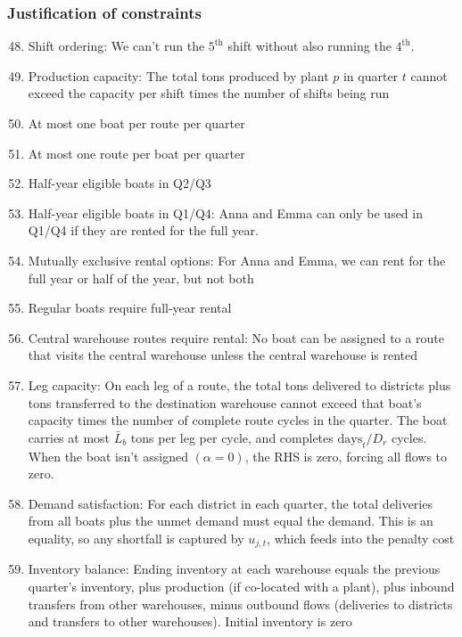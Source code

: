 \documentclass[10pt]{article}
\begin{document}
\subsubsection{Justification of constraints}
\begin{enumerate}
    \setcounter{enumi}{47}
    \item Shift ordering: We can't run the $5^{\text{th}}$ shift without also running the $4^{\text{th}}$. 
    \item Production capacity: The total tons produced by plant $p $ in quarter $t $ cannot exceed the capacity per shift times the number of shifts being run 
    \item At most one boat per route per quarter
    \item At most one route per boat per quarter 
    \item Half-year eligible boats in Q2/Q3
    \item Half-year eligible boats in Q1/Q4: Anna and Emma can only be used in Q1/Q4 if they are rented for the full year. 
    \item Mutually exclusive rental options: For Anna and Emma, we can rent for the full year or half of the year, but not both
    \item Regular boats require full-year rental 
    \item Central warehouse routes require rental: No boat can be assigned to a route that visits the central warehouse unless the central warehouse is rented 
    \item Leg capacity: On each leg of a route, the total tons delivered to districts plus tons transferred to the destination warehouse cannot exceed that boat's capacity times the number of complete route cycles in the quarter. The boat carries at most $\bar{L}_b $ tons per leg per cycle, and completes $\text{days}_t/D_r $ cycles. When the boat isn't assigned $(\alpha = 0) $, the RHS is zero, forcing all flows to zero.
    \item Demand satisfaction: For each district in each quarter, the total deliveries from all boats plus the unmet demand must equal the demand. This is an equality, so any shortfall is captured by $u_{j, t} $, which feeds into the penalty cost
    \item Inventory balance: Ending inventory at each warehouse equals the previous quarter's inventory, plus production (if co-located with a plant), plus inbound transfers from other warehouses, minus outbound flows (deliveries to districts and transfers to other warehouses). Initial inventory is zero

\end{enumerate}
\end{document}
